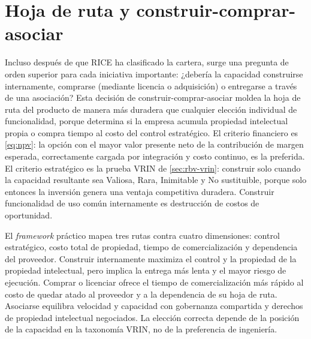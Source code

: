 \section{Hoja de ruta y construir-comprar-asociar}\label{sec:roadmap}

Incluso después de que RICE ha clasificado la cartera, surge una pregunta de orden superior
para cada iniciativa importante: ¿debería la capacidad construirse internamente, comprarse
(mediante licencia o adquisición) o entregarse a través de una asociación? Esta decisión
de construir-comprar-asociar moldea la hoja de ruta del producto de manera más duradera
que cualquier elección individual de funcionalidad, porque determina si la empresa acumula
propiedad intelectual propia o compra tiempo al costo del control estratégico. El criterio
financiero es \cref{eq:npv}: la opción con el mayor valor presente neto de la contribución
de margen esperada, correctamente cargada por integración y costo continuo, es la preferida.
El criterio estratégico es la prueba VRIN de \cref{sec:rbv-vrin}: construir solo cuando la
capacidad resultante sea Valiosa, Rara, Inimitable y No sustituible, porque solo entonces
la inversión genera una ventaja competitiva duradera. Construir funcionalidad de uso común
internamente es destrucción de costos de oportunidad.

El \emph{framework} práctico mapea tres rutas contra cuatro dimensiones: control estratégico,
costo total de propiedad, tiempo de comercialización y dependencia del proveedor. Construir
internamente maximiza el control y la propiedad de la propiedad intelectual, pero implica
la entrega más lenta y el mayor riesgo de ejecución. Comprar o licenciar ofrece el tiempo
de comercialización más rápido al costo de quedar atado al proveedor y a la dependencia de
su hoja de ruta. Asociarse equilibra velocidad y capacidad con gobernanza compartida y
derechos de propiedad intelectual negociados. La elección correcta depende de la posición
de la capacidad en la taxonomía VRIN, no de la preferencia de ingeniería.

